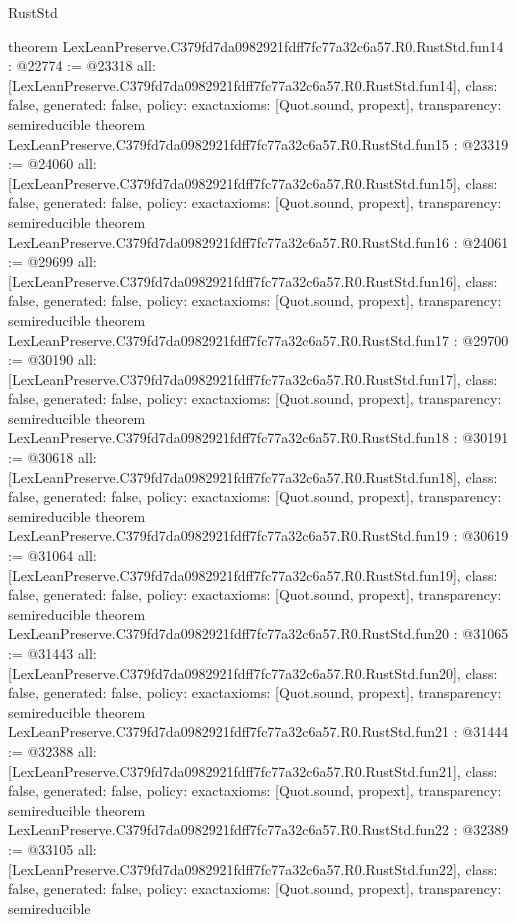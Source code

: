 \begin{lexlean}{RustStd}
\begin{coremodule}
{}
theorem LexLeanPreserve.C379fd7da0982921fdff7fc77a32c6a57.R0.RustStd.fun14 : @22774 := @23318 {
  all: [LexLeanPreserve.C379fd7da0982921fdff7fc77a32c6a57.R0.RustStd.fun14],
  class: false,
  generated: false,
  policy: exact{axioms: [Quot.sound, propext]},
  transparency: semireducible
}
theorem LexLeanPreserve.C379fd7da0982921fdff7fc77a32c6a57.R0.RustStd.fun15 : @23319 := @24060 {
  all: [LexLeanPreserve.C379fd7da0982921fdff7fc77a32c6a57.R0.RustStd.fun15],
  class: false,
  generated: false,
  policy: exact{axioms: [Quot.sound, propext]},
  transparency: semireducible
}
theorem LexLeanPreserve.C379fd7da0982921fdff7fc77a32c6a57.R0.RustStd.fun16 : @24061 := @29699 {
  all: [LexLeanPreserve.C379fd7da0982921fdff7fc77a32c6a57.R0.RustStd.fun16],
  class: false,
  generated: false,
  policy: exact{axioms: [Quot.sound, propext]},
  transparency: semireducible
}
theorem LexLeanPreserve.C379fd7da0982921fdff7fc77a32c6a57.R0.RustStd.fun17 : @29700 := @30190 {
  all: [LexLeanPreserve.C379fd7da0982921fdff7fc77a32c6a57.R0.RustStd.fun17],
  class: false,
  generated: false,
  policy: exact{axioms: [Quot.sound, propext]},
  transparency: semireducible
}
theorem LexLeanPreserve.C379fd7da0982921fdff7fc77a32c6a57.R0.RustStd.fun18 : @30191 := @30618 {
  all: [LexLeanPreserve.C379fd7da0982921fdff7fc77a32c6a57.R0.RustStd.fun18],
  class: false,
  generated: false,
  policy: exact{axioms: [Quot.sound, propext]},
  transparency: semireducible
}
theorem LexLeanPreserve.C379fd7da0982921fdff7fc77a32c6a57.R0.RustStd.fun19 : @30619 := @31064 {
  all: [LexLeanPreserve.C379fd7da0982921fdff7fc77a32c6a57.R0.RustStd.fun19],
  class: false,
  generated: false,
  policy: exact{axioms: [Quot.sound, propext]},
  transparency: semireducible
}
theorem LexLeanPreserve.C379fd7da0982921fdff7fc77a32c6a57.R0.RustStd.fun20 : @31065 := @31443 {
  all: [LexLeanPreserve.C379fd7da0982921fdff7fc77a32c6a57.R0.RustStd.fun20],
  class: false,
  generated: false,
  policy: exact{axioms: [Quot.sound, propext]},
  transparency: semireducible
}
theorem LexLeanPreserve.C379fd7da0982921fdff7fc77a32c6a57.R0.RustStd.fun21 : @31444 := @32388 {
  all: [LexLeanPreserve.C379fd7da0982921fdff7fc77a32c6a57.R0.RustStd.fun21],
  class: false,
  generated: false,
  policy: exact{axioms: [Quot.sound, propext]},
  transparency: semireducible
}
theorem LexLeanPreserve.C379fd7da0982921fdff7fc77a32c6a57.R0.RustStd.fun22 : @32389 := @33105 {
  all: [LexLeanPreserve.C379fd7da0982921fdff7fc77a32c6a57.R0.RustStd.fun22],
  class: false,
  generated: false,
  policy: exact{axioms: [Quot.sound, propext]},
  transparency: semireducible
}
\end{coremodule}
\end{lexlean}
